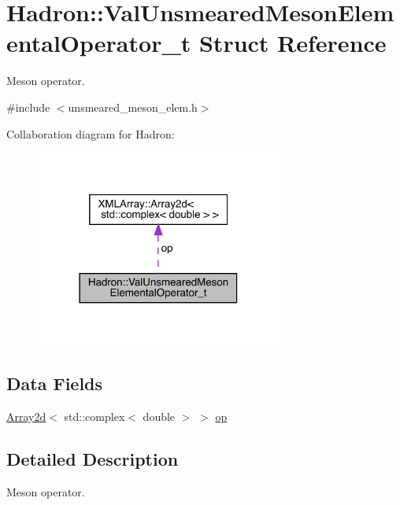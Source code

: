 \hypertarget{structHadron_1_1ValUnsmearedMesonElementalOperator__t}{}\section{Hadron\+:\+:Val\+Unsmeared\+Meson\+Elemental\+Operator\+\_\+t Struct Reference}
\label{structHadron_1_1ValUnsmearedMesonElementalOperator__t}


Meson operator.  




{\ttfamily \#include $<$unsmeared\+\_\+meson\+\_\+elem.\+h$>$}



Collaboration diagram for Hadron\+:\nopagebreak
\begin{figure}[H]
\begin{center}
\leavevmode
\includegraphics[width=230pt]{d9/d84/structHadron_1_1ValUnsmearedMesonElementalOperator__t__coll__graph}
\end{center}
\end{figure}
\subsection*{Data Fields}
\begin{DoxyCompactItemize}
\item 
\mbox{\hyperlink{classXMLArray_1_1Array2d}{Array2d}}$<$ std\+::complex$<$ double $>$ $>$ \mbox{\hyperlink{structHadron_1_1ValUnsmearedMesonElementalOperator__t_a9c26c91ba7ac8b4ed0c89f5a3bd247e4}{op}}
\end{DoxyCompactItemize}


\subsection{Detailed Description}
Meson operator. 

